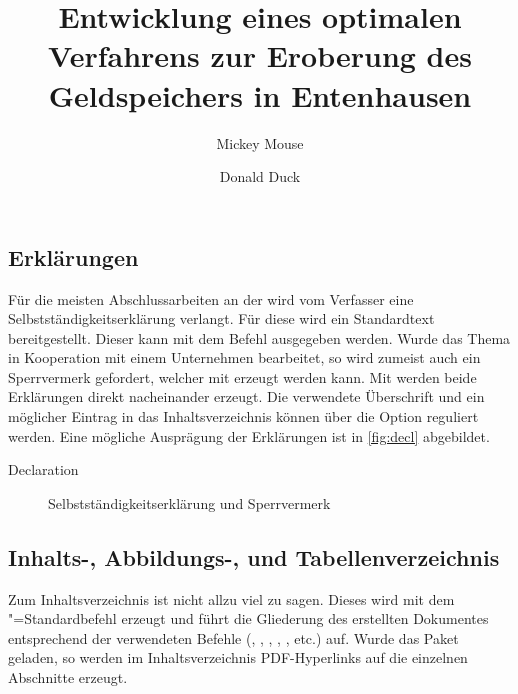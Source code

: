 \documentclass[%
  english,ngerman,%
  geometry=no,DIV=12,automark,%
]{tudscrartcl}
\begin{document}
\subsection{Erklärungen}
Für die meisten Abschlussarbeiten an der \TnUD wird vom Verfasser eine 
Selbstständigkeitserklärung verlangt. Für diese wird ein Standardtext 
bereitgestellt. Dieser kann mit dem Befehl  ausgegeben 
werden. Wurde das Thema in Kooperation mit einem Unternehmen bearbeitet, so 
wird zumeist auch ein Sperrvermerk gefordert, welcher mit  
erzeugt werden kann. Mit  werden beide Erklärungen direkt 
nacheinander erzeugt. Die verwendete Überschrift und ein möglicher Eintrag in 
das Inhaltsverzeichnis können über die Option  reguliert 
werden. Eine mögliche Ausprägung der Erklärungen ist in \autoref{fig:decl} 
abgebildet.
%
\begin{Excerpt!}{Declaration}
\title{%
  Entwicklung eines optimalen Verfahrens zur Eroberung des
  Geldspeichers in Entenhausen
}
\author{Mickey Mouse\and Donald Duck}
\declaration[company=FIRMA]
\end{Excerpt!}
%
\begin{figure}
\centering
{}
\caption{Selbstständigkeitserklärung und Sperrvermerk}
\label{fig:decl}
\end{figure}


\subsection{Inhalts-, Abbildungs-, und Tabellenverzeichnis}
Zum Inhaltsverzeichnis ist nicht allzu viel zu sagen. Dieses wird mit dem
"=Standardbefehl  erzeugt und führt die 
Gliederung des erstellten Dokumentes entsprechend der verwendeten Befehle 
(, , , , 
,  etc.) auf. Wurde das Paket  
geladen, so werden im Inhaltsverzeichnis PDF-Hyperlinks auf die einzelnen 
Abschnitte erzeugt.
\end{document}
